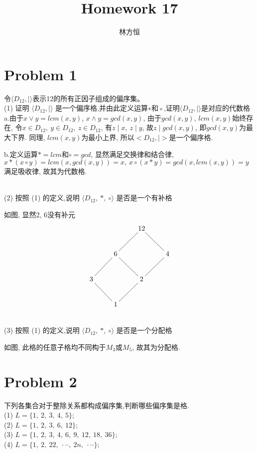 \documentclass{article}
\title{\heiti\zihao{2} Homework 17}
\author{\songti 231275040 林方恒}
\begin{document}
	\maketitle
	\thispagestyle{empty}

\section{Problem 1}\par
令$\langle D_{12}, \mid \rangle$表示12的所有正因子组成的偏序集。\\
(1) 证明 $\langle D_{12}, \mid \rangle$ 是一个偏序格,并由此定义运算∗和◦,证明$\langle D_{12}, \mid \rangle$是对应的代数格\\

a.由于$x \vee y = lcm(x, y)$, $x \wedge y = gcd(x, y)$, 
由于$gcd(x, y)$, $lcm(x, y)$始终存在,
令$x \in D_{12},\ y \in D_{12},\ z \in D_{12}$, 
有$z \mid x,\ z \mid y $, 故$z \mid gcd(x, y)$, 即$gcd(x, y)$为最大下界.
同理, $lcm(x, y)$为最小上界, 所以$<D_{12}, |>$是一个偏序格.\par
b.定义运算$\ast = lcm$和$\circ = gcd$, 显然满足交换律和结合律, 
$ x \ast (x \circ y) = lcm(x, gcd(x, y)) = x,\ x \circ (x \ast y) = gcd(x, lcm(x, y)) = y$
满足吸收律, 故其为代数格.

~\\
(2) 按照 (1) 的定义,说明 $\langle D_{12},\ \ast,\ \circ \rangle$ 是否是一个有补格\par
如图, 显然2, 6没有补元
$$
\def\arl{\ar@{-}}
\xymatrix{
  &  &  12\arl[dl]\arl[dr]  &  \\
  &  6\arl[dl]\arl[dr] &  &4\arl[dl]\\
  3\arl[dr] & &2\arl[dl] & \\
  &1&&\\
}
$$

~\\
(3) 按照 (1) 的定义,说明 $\langle D_{12},\ \ast,\ \circ \rangle$ 是否是一个分配格

如图, 此格的任意子格均不同构于$M_3$或$M_5$, 故其为分配格.
\newpage
\section{Problem 2}\par
下列各集合对于整除关系都构成偏序集,判断哪些偏序集是格.\\
(1) $L = \{1,\ 2,\ 3,\ 4,\ 5\};$\\
(2) $L = \{1,\ 2,\ 3,\ 6,\ 12\};$\\
(3) $L = \{1,\ 2,\ 3,\ 4,\ 6,\ 9,\ 12,\ 18,\ 36\};$\\
(4) $L = \{1,\ 2,\ 22 ,\ · · · ,\ 2n ,\ · · · \};$\\
\end{document}
